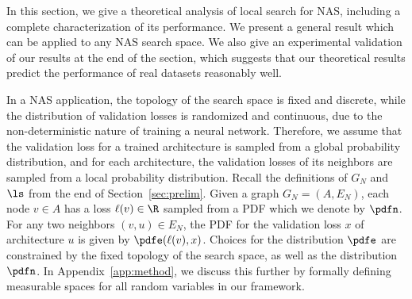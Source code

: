 

In this section, we give a theoretical analysis of local search for NAS,
including a complete characterization of its performance.
We present a general result which can be applied to any NAS search space.
We also give an experimental validation of our results at the end of the
section, which suggests that our theoretical results predict the performance
of real datasets reasonably well.

In a NAS application,
the topology of the search space is fixed and discrete, 
while the distribution of validation losses
is randomized and continuous,
due to the non-deterministic nature of training a neural network.
Therefore, we assume that the validation loss for a trained architecture 
is sampled from
a global probability distribution, and for each architecture, 
the validation losses of its neighbors are sampled from a local probability distribution.
Recall the definitions of $G_N$ and $\ls$ from the end of
Section~\ref{sec:prelim}.
Given a graph $G_N=(A, E_N)$, each node $v \in A$ has a loss 
$\ell(v) \in \R$ sampled from a PDF which we denote by $\pdfn$. 
For any two neighbors $(v, u) \in E_N$, the PDF for the validation loss $x$ 
of architecture $u$ is given by $\pdfe(\ell(v), x)$.
Choices for the distribution $\pdfe$ are constrained by the 
fixed topology of the search space, as well as the distribution $\pdfn$.
In Appendix~\ref{app:method}, 
we discuss this further by formally defining
measurable spaces for all random variables in our framework.

